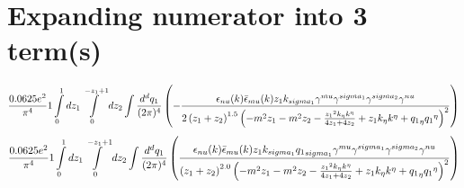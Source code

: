 \section*{Expanding numerator into 3 term(s)}
\begin{dmath}\frac{0.0625 e^{2}}{\pi^{4}}1\int\limits_{ 0 }^{ 1 } d{ z_{ 1 } }\int\limits_{ 0 }^{ - { z_{ 1 } } + 1 } d{ z_{ 2 } }\int\frac{d^d q_1 }{ (2\pi)^4 }\left(- \frac{\epsilon_{ \\nu }({ k }) \bar{\epsilon}_{ \\mu }({ k }) { z_{ 1 } } { { k }_{ \\sigma_1 } } { \gamma^{ \\mu } } { \gamma^{ \\sigma_1 } } { \gamma^{ \\sigma_2 } } { \gamma^{ \\nu } }}{2 \left({ z_{ 1 } } + { z_{ 2 } }\right)^{1.5} \left(- m^{2} { z_{ 1 } } - m^{2} { z_{ 2 } } - \frac{{ z_{ 1 } }^{2} { { k }_{ \eta } } { { k }^{ \eta } }}{4 { z_{ 1 } } + 4 { z_{ 2 } }} + { z_{ 1 } } { { k }_{ \eta } } { { k }^{ \eta } } + { { q_1 }_{ \eta } } { { q_1 }^{ \eta } }\right)^{2}}\right)\end{dmath}
\begin{dmath}\frac{0.0625 e^{2}}{\pi^{4}}1\int\limits_{ 0 }^{ 1 } d{ z_{ 1 } }\int\limits_{ 0 }^{ - { z_{ 1 } } + 1 } d{ z_{ 2 } }\int\frac{d^d q_1 }{ (2\pi)^4 }\left(\frac{\epsilon_{ \\nu }({ k }) \bar{\epsilon}_{ \\mu }({ k }) { z_{ 1 } } { { k }_{ \\sigma_1 } } { { q_1 }_{ \\sigma_1 } } { \gamma^{ \\mu } } { \gamma^{ \\sigma_1 } } { \gamma^{ \\sigma_2 } } { \gamma^{ \\nu } }}{\left({ z_{ 1 } } + { z_{ 2 } }\right)^{2.0} \left(- m^{2} { z_{ 1 } } - m^{2} { z_{ 2 } } - \frac{{ z_{ 1 } }^{2} { { k }_{ \eta } } { { k }^{ \eta } }}{4 { z_{ 1 } } + 4 { z_{ 2 } }} + { z_{ 1 } } { { k }_{ \eta } } { { k }^{ \eta } } + { { q_1 }_{ \eta } } { { q_1 }^{ \eta } }\right)^{2}}\right)\end{dmath}
